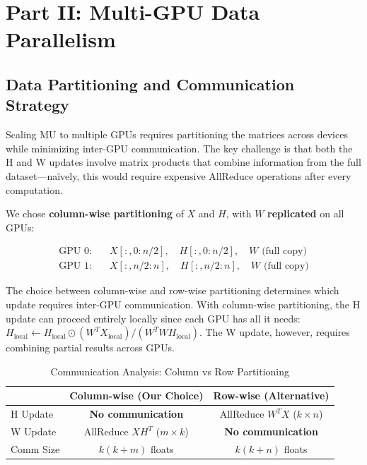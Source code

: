 \documentclass[11pt]{article}
\begin{document}
\section{Part II: Multi-GPU Data Parallelism}

\subsection{Data Partitioning and Communication Strategy}

Scaling MU to multiple GPUs requires partitioning the matrices across devices while minimizing inter-GPU communication. The key challenge is that both the H and W updates involve matrix products that combine information from the full dataset---na\"ively, this would require expensive AllReduce operations after every computation.

We chose \textbf{column-wise partitioning} of $X$ and $H$, with $W$ \textbf{replicated} on all GPUs:

\begin{equation}
\begin{aligned}
    \text{GPU 0:} & \quad X[:, 0:n/2], \quad H[:, 0:n/2], \quad W \text{ (full copy)} \\
    \text{GPU 1:} & \quad X[:, n/2:n], \quad H[:, n/2:n], \quad W \text{ (full copy)}
\end{aligned}
\end{equation}

The choice between column-wise and row-wise partitioning determines which update requires inter-GPU communication. With column-wise partitioning, the H update can proceed entirely locally since each GPU has all it needs: $H_{\text{local}} \leftarrow H_{\text{local}} \odot (W^T X_{\text{local}}) / (W^T W H_{\text{local}})$. The W update, however, requires combining partial results across GPUs.

\begin{table}[h]
\centering
\caption{Communication Analysis: Column vs Row Partitioning}
\begin{tabular}{@{}lcc@{}}
\toprule
& Column-wise (Our Choice) & Row-wise (Alternative) \\ \midrule
H Update & \textbf{No communication} & AllReduce $W^T X$ ($k \times n$) \\
W Update & AllReduce $XH^T$ ($m \times k$) & \textbf{No communication} \\
Comm Size & $k(k + m)$ floats & $k(k + n)$ floats \\ \bottomrule
\end{tabular}
\end{table}
\end{document}
